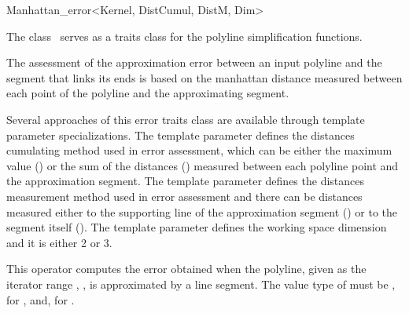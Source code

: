 
\begin{ccRefClass}{Manhattan_error<Kernel, DistCumul, DistM, Dim>}

\ccDefinition
  
The class \ccRefName\ serves as a traits class for the polyline
simplification functions.

The assessment of the approximation error between an
input polyline and the segment that links its ends is based on the
manhattan distance measured between each point of the polyline and the
approximating segment.

Several approaches of this error traits class are available through
template parameter specializations. The  template parameter
defines the distances cumulating method used in error assessment,
which can be either the maximum value () or the sum of the distances
()
measured between each polyline point and the approximation segment.
The  template parameter defines the distances measurement method used
in error assessment and there can be distances measured either to the
supporting line of the approximation segment () or to the
segment itself (). The  template parameter defines the working space dimension
and it is either 2 or 3.




\ccIsModel



\ccTypes


\ccOperations

{This operator computes the error obtained when the polyline, given as the iterator range , , 
is approximated by a line segment. The value type of  must be , for ,
and, for .}


\end{ccRefClass}
